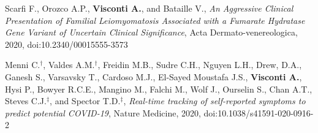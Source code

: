 \documentclass[a4paper,10pt]{article}
\begin{document}
{\begin{itemize}
		 Scarfi F., Orozco A.P., \textbf{Visconti A.}, and Bataille V., \emph{An Aggressive Clinical Presentation of Familial Leiomyomatosis Associated with a Fumarate Hydratase Gene Variant of Uncertain Clinical Significance}, Acta Dermato-venereologica, 2020, doi:10.2340/00015555-3573

		 Menni C.$^{\textbf{$\dag $}}$, Valdes A.M.$^{\textbf{$\dag $}}$, Freidin M.B., Sudre C.H., Nguyen L.H., Drew, D.A., Ganesh S., Varsavsky T., Cardoso M.J., El-Sayed Moustafa J.S., \textbf{Visconti A.}, Hysi P., Bowyer R.C.E., Mangino M., Falchi M., Wolf J., Ourselin S., Chan A.T., Steves C.J.$^{\textbf{$\ddag $}}$, and Spector T.D.$^{\textbf{$\ddag $}}$, \emph{Real-time tracking of self-reported symptoms to predict potential COVID-19}, Nature Medicine, 2020, doi:10.1038/s41591-020-0916-2

	\end{itemize}
}
\end{document}
